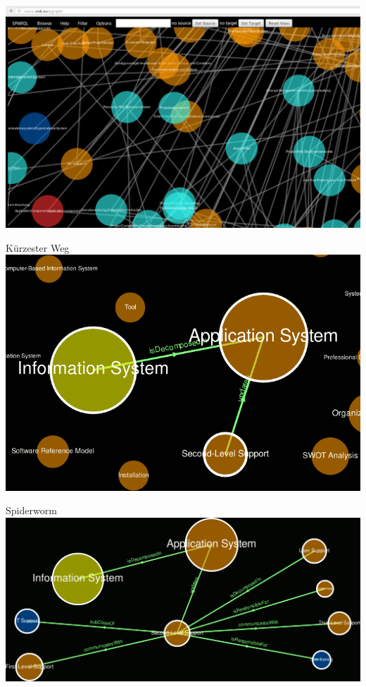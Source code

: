 \documentclass[14pt,aspectratio=1610]{beamer}
\begin{document}
\begin{frame}{}
\centering\includegraphics[width=1.05\textwidth,height=1.05\textheight,keepaspectratio]{img/pbrowser.png}
\end{frame}

\begin{frame}{Kürzester Weg}
\centering\includegraphics[width=\textwidth,height=\textheight,keepaspectratio]{img/shortestpath.png}
\end{frame}

\begin{frame}{Spiderworm}
\centering\includegraphics[width=\textwidth,height=\textheight,keepaspectratio]{img/spiderworm.png}
\end{frame}
\end{document}
